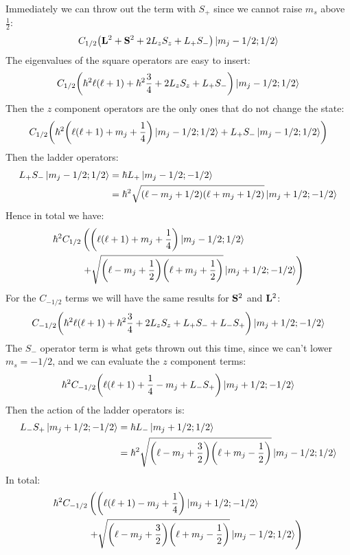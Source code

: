 \documentclass[12pt]{article}
\renewcommand{\l}{\ell}
\begin{document}
Immediately we can throw out the term with $S_+$ since we cannot raise $m_s$ above $\frac12$:
\begin{align*}
  C_{1/2}\qty(\vb{L}^2+\vb{S}^2+2L_zS_z+L_+S_-)\ket{m_j-1/2;1/2}
\end{align*}
The eigenvalues of the square operators are easy to insert:
\begin{align*}
  C_{1/2}\qty(\hbar^2\l(\l+1)+\hbar^2\frac34+2L_zS_z+L_+S_-)\ket{m_j-1/2;1/2}
\end{align*}
Then the $z$ component operators are the only ones that do not change the state:
\begin{align*}
  C_{1/2}\qty(\hbar^2\qty(\l(\l+1)+m_j+\frac14)\ket{m_j-1/2;1/2}
  +L_+S_-\ket{m_j-1/2;1/2})
\end{align*}
Then the ladder operators:
\begin{align*}
  L_+S_-\ket{m_j-1/2;1/2}&=\hbar L_+\ket{m_j-1/2;-1/2}\\
  &=\hbar^2\sqrt{(\l-m_j+1/2)(\l+m_j+1/2)}\ket{m_j+1/2;-1/2}
\end{align*}
Hence in total we have:
\begin{align*}
  \hbar^2C_{1/2}&\left(\qty(\l(\l+1)+m_j+\frac14)\ket{m_j-1/2;1/2}\right. \\
  &\left.+\sqrt{\qty(\l-m_j+\frac12)\qty(\l+m_j+\frac12)}
    \ket{m_j+1/2;-1/2}\right)
\end{align*}
For the $C_{-1/2}$ terms we will have the same results for $\vb{S}^2$ and $\vb{L}^2$:
\begin{align*}
  C_{-1/2}\qty(\hbar^2\l(\l+1)+\hbar^2\frac34+2L_zS_z+L_+S_-+L_-S_+)
  \ket{m_j+1/2;-1/2}
\end{align*}
The $S_-$ operator term is what gets thrown out this time, since we can't lower $m_s=-1/2$, and we can evaluate the $z$ component terms:
\begin{align*}
  \hbar^2C_{-1/2}\qty(\l(\l+1)+\frac14-m_j+L_-S_+)\ket{m_j+1/2;-1/2}
\end{align*}
Then the action of the ladder operators is:
\begin{align*}
  L_-S_+\ket{m_j+1/2;-1/2}&=\hbar L_-\ket{m_j+1/2;1/2}\\
  &=\hbar^2\sqrt{\qty(\l-m_j+\frac32)\qty(\l+m_j-\frac12)}\ket{m_j-1/2;1/2}
\end{align*}
In total:
\begin{align*}
  \hbar^2C_{-1/2}&\left(\qty(\l(\l+1)-m_j+\frac14)\ket{m_j+1/2;-1/2}\right. \\
  &\left.+\sqrt{\qty(\l-m_j+\frac32)\qty(\l+m_j-\frac12)}
    \ket{m_j-1/2;1/2}\right)
\end{align*}
\end{document}
